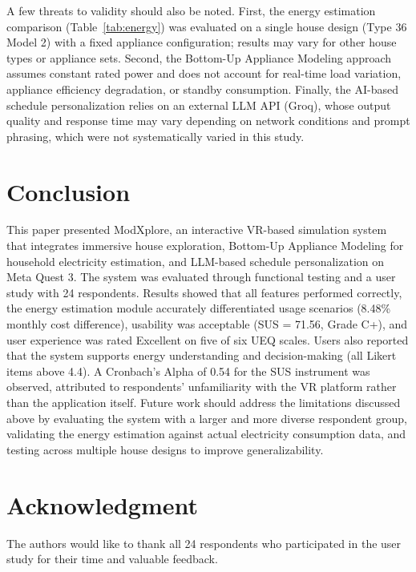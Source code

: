 \documentclass[conference]{IEEEtran}
\begin{document}
A few threats to validity should also be noted. First, the energy estimation comparison (Table~\ref{tab:energy}) was evaluated on a single house design (Type 36 Model 2) with a fixed appliance configuration; results may vary for other house types or appliance sets. Second, the Bottom-Up Appliance Modeling approach assumes constant rated power and does not account for real-time load variation, appliance efficiency degradation, or standby consumption. Finally, the AI-based schedule personalization relies on an external LLM API (Groq), whose output quality and response time may vary depending on network conditions and prompt phrasing, which were not systematically varied in this study.

\section{Conclusion}

This paper presented ModXplore, an interactive VR-based simulation system that integrates immersive house exploration, Bottom-Up Appliance Modeling for household electricity estimation, and LLM-based schedule personalization on Meta Quest 3. The system was evaluated through functional testing and a user study with 24 respondents. Results showed that all features performed correctly, the energy estimation module accurately differentiated usage scenarios (8.48\% monthly cost difference), usability was acceptable (SUS = 71.56, Grade C+), and user experience was rated Excellent on five of six UEQ scales. Users also reported that the system supports energy understanding and decision-making (all Likert items above 4.4). A Cronbach's Alpha of 0.54 for the SUS instrument was observed, attributed to respondents' unfamiliarity with the VR platform rather than the application itself. Future work should address the limitations discussed above by evaluating the system with a larger and more diverse respondent group, validating the energy estimation against actual electricity consumption data, and testing across multiple house designs to improve generalizability.

\section*{Acknowledgment}

The authors would like to thank all 24 respondents who participated in the user study for their time and valuable feedback.
\end{document}
